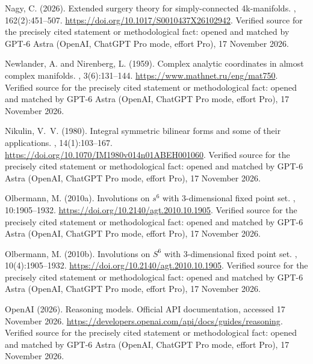 \begin{thebibliography}{}
Nagy, C. (2026).
\newblock Extended surgery theory for simply-connected 4k-manifolds.
, 162(2):451--507.
\newblock \url{https://doi.org/10.1017/S0010437X26102942}. Verified source for the precisely cited statement or methodological fact: opened and matched by GPT-6 Astra (OpenAI, ChatGPT Pro mode, effort Pro), 17 November 2026.

Newlander, A. and Nirenberg, L. (1959).
\newblock Complex analytic coordinates in almost complex manifolds.
, 3(6):131--144.
\newblock \url{https://www.mathnet.ru/eng/mat750}. Verified source for the precisely cited statement or methodological fact: opened and matched by GPT-6 Astra (OpenAI, ChatGPT Pro mode, effort Pro), 17 November 2026.

Nikulin, V.~V. (1980).
\newblock Integral symmetric bilinear forms and some of their applications.
, 14(1):103--167.
\newblock \url{https://doi.org/10.1070/IM1980v014n01ABEH001060}. Verified source for the precisely cited statement or methodological fact: opened and matched by GPT-6 Astra (OpenAI, ChatGPT Pro mode, effort Pro), 17 November 2026.

Olbermann, M. (2010a).
\newblock Involutions on $s^6$ with 3-dimensional fixed point set.
, 10:1905--1932.
\newblock \url{https://doi.org/10.2140/agt.2010.10.1905}. Verified source for the precisely cited statement or methodological fact: opened and matched by GPT-6 Astra (OpenAI, ChatGPT Pro mode, effort Pro), 17 November 2026.

Olbermann, M. (2010b).
\newblock Involutions on {$S^6$} with 3-dimensional fixed point set.
, 10(4):1905--1932.
\newblock \url{https://doi.org/10.2140/agt.2010.10.1905}. Verified source for the precisely cited statement or methodological fact: opened and matched by GPT-6 Astra (OpenAI, ChatGPT Pro mode, effort Pro), 17 November 2026.

{OpenAI} (2026).
\newblock Reasoning models.
\newblock Official API documentation, accessed 17 November 2026.
\newblock \url{https://developers.openai.com/api/docs/guides/reasoning}. Verified source for the precisely cited statement or methodological fact: opened and matched by GPT-6 Astra (OpenAI, ChatGPT Pro mode, effort Pro), 17 November 2026.


\end{thebibliography}
